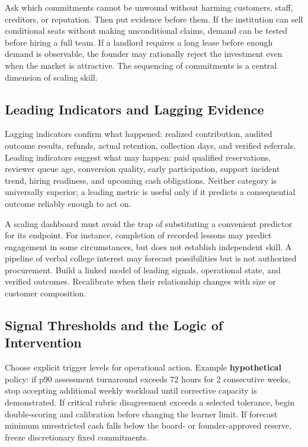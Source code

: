 Ask which commitments cannot be unwound without harming customers, staff, creditors, or reputation. Then put evidence before them. If the institution can sell conditional seats without making unconditional claims, demand can be tested before hiring a full team. If a landlord requires a long lease before enough demand is observable, the founder may rationally reject the investment even when the market is attractive. The sequencing of commitments is a central dimension of scaling skill.

\subsection{Leading Indicators and Lagging Evidence}
\label{sec:leading_indicators_lagging_evidence}

Lagging indicators confirm what happened: realized contribution, audited outcome results, refunds, actual retention, collection days, and verified referrals. Leading indicators suggest what may happen: paid qualified reservations, reviewer queue age, conversion quality, early participation, support incident trend, hiring readiness, and upcoming cash obligations. Neither category is universally superior; a leading metric is useful only if it predicts a consequential outcome reliably enough to act on.

A scaling dashboard must avoid the trap of substituting a convenient predictor for its endpoint. For instance, completion of recorded lessons may predict engagement in some circumstances, but does not establish independent skill. A pipeline of verbal college interest may forecast possibilities but is not authorized procurement. Build a linked model of leading signals, operational state, and verified outcomes. Recalibrate when their relationship changes with size or customer composition.

\subsection{Signal Thresholds and the Logic of Intervention}
\label{sec:signal_thresholds_logic}

Choose explicit trigger levels for operational action. Example \textbf{hypothetical} policy: if p90 assessment turnaround exceeds 72 hours for 2 consecutive weeks, stop accepting additional weekly workload until corrective capacity is demonstrated. If critical rubric disagreement exceeds a selected tolerance, begin double-scoring and calibration before changing the learner limit. If forecast minimum unrestricted cash falls below the board- or founder-approved reserve, freeze discretionary fixed commitments.

